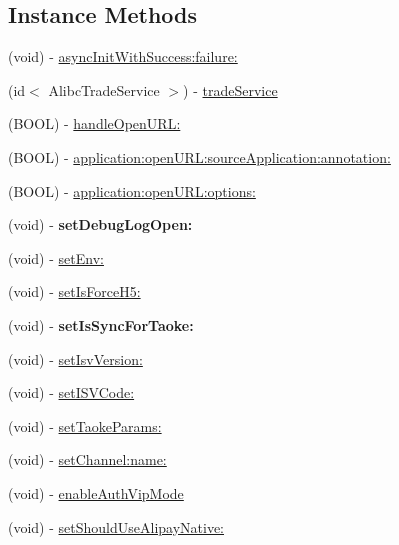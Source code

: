 \subsection*{Instance Methods}
\begin{DoxyCompactItemize}
\item 
(void) -\/ \mbox{\hyperlink{interface_alibc_trade_s_d_k_a546e15ca3558e068f5fea8efbba6a120}{async\+Init\+With\+Success\+:failure\+:}}
\item 
(id$<$ Alibc\+Trade\+Service $>$) -\/ \mbox{\hyperlink{interface_alibc_trade_s_d_k_aaccd78be3aa24071dfe2ac7d712beb60}{trade\+Service}}
\item 
(B\+O\+OL) -\/ \mbox{\hyperlink{interface_alibc_trade_s_d_k_a4204ac5e0437459deea80e13b00c0627}{handle\+Open\+U\+R\+L\+:}}
\item 
(B\+O\+OL) -\/ \mbox{\hyperlink{interface_alibc_trade_s_d_k_aa8834b840184b61ee5834f900ca8ff91}{application\+:open\+U\+R\+L\+:source\+Application\+:annotation\+:}}
\item 
(B\+O\+OL) -\/ \mbox{\hyperlink{interface_alibc_trade_s_d_k_a13a7bccd67facb9fa46296ead7571f0b}{application\+:open\+U\+R\+L\+:options\+:}}
\item 
\mbox{\label{interface_alibc_trade_s_d_k_a576e2e7c36d64eb0567e02e6ae88b927}} 
(void) -\/ {\bfseries set\+Debug\+Log\+Open\+:}
\item 
(void) -\/ \mbox{\hyperlink{interface_alibc_trade_s_d_k_a08d8381b1c9bef18ff5ee50ced4747b4}{set\+Env\+:}}
\item 
(void) -\/ \mbox{\hyperlink{interface_alibc_trade_s_d_k_aa0905a77885d33d44762a552acdcef2d}{set\+Is\+Force\+H5\+:}}
\item 
\mbox{\label{interface_alibc_trade_s_d_k_a063034f81c715415adb27a37cde8480c}} 
(void) -\/ {\bfseries set\+Is\+Sync\+For\+Taoke\+:}
\item 
(void) -\/ \mbox{\hyperlink{interface_alibc_trade_s_d_k_aaf25692948a3bcad5f2099789c92b5c8}{set\+Isv\+Version\+:}}
\item 
(void) -\/ \mbox{\hyperlink{interface_alibc_trade_s_d_k_a9e2f6b18663323c17cdcfa8fc42e0c32}{set\+I\+S\+V\+Code\+:}}
\item 
(void) -\/ \mbox{\hyperlink{interface_alibc_trade_s_d_k_aa6e5c46a89ab3539e6d95b827d31bae5}{set\+Taoke\+Params\+:}}
\item 
(void) -\/ \mbox{\hyperlink{interface_alibc_trade_s_d_k_ab52eb7ebf4462b6f44f3441df9c75e03}{set\+Channel\+:name\+:}}
\item 
(void) -\/ \mbox{\hyperlink{interface_alibc_trade_s_d_k_a3d359fcee90883874d9f95757ef069c8}{enable\+Auth\+Vip\+Mode}}
\item 
(void) -\/ \mbox{\hyperlink{interface_alibc_trade_s_d_k_aacfcf26210f84b53ce09dd44e68dd91a}{set\+Should\+Use\+Alipay\+Native\+:}}
\end{DoxyCompactItemize}
